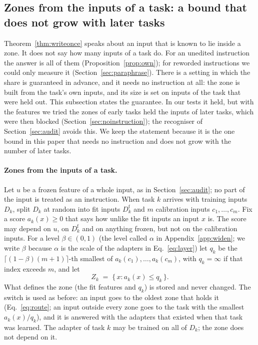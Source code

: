 \subsection{Zones from the inputs of a task: a bound that does not grow with later tasks}
\label{sec:bound}

Theorem~\ref{thm:writeonce} speaks about an input that is known to lie inside a zone. It does not
say how many inputs of a task do. For an unedited instruction the answer is all of them
(Proposition~\ref{prop:own}); for reworded instructions we could only measure it
(Section~\ref{sec:paraphrase}). There is a setting in which the share is guaranteed in advance, and
it needs no instruction at all: the zone is built from the task's own inputs, and its size is set
on inputs of the task that were held out. This subsection states the guarantee. In our tests it held, but with the features we
tried the zones of early tasks held the inputs of later tasks, which were then blocked
(Section~\ref{sec:noinstruction}); the recogniser of Section~\ref{sec:audit} avoids this. We keep
the statement because it is the one bound in this paper that needs no instruction and does not
grow with the number of later tasks.

\paragraph{Zones from the inputs of a task.} Let $u$ be a frozen feature of a whole input, as in
Section~\ref{sec:audit}; no part of the input is treated as an instruction. When task $k$ arrives with training inputs $D_k$, split
$D_k$ at random into fit inputs $D_k^{\mathrm{f}}$ and $m$ calibration inputs $c_1, \dots, c_m$.
Fix a score $a_k(x) \ge 0$ that says how unlike the fit inputs an input $x$ is. The score may depend
on $u$, on $D_k^{\mathrm{f}}$ and on anything frozen, but not on the calibration inputs. For a level
$\beta \in (0,1)$ (the level called $\alpha$ in Appendix~\ref{app:widen}; we write $\beta$ because $\alpha$ is the scale of the adapters in Eq.~\eqref{eq:layer}) let $q_k$ be the $\lceil (1-\beta)(m+1) \rceil$-th smallest of
$a_k(c_1), \dots, a_k(c_m)$, with $q_k = \infty$ if that index exceeds $m$, and let
\begin{equation}
  Z_k \;=\; \{\, x : a_k(x) \le q_k \,\} .
  \label{eq:inputzone}
\end{equation}
What defines the zone (the fit features and $q_k$) is stored and never changed. The switch is used
as before: an input goes to the oldest zone that holds it (Eq.~\eqref{eq:route}; an input outside every zone goes to the task with the smallest $a_k(x)/q_k$), and it is answered
with the adapters that existed when that task was learned. The adapter of task $k$ may be trained
on all of $D_k$; the zone does not depend on it.


